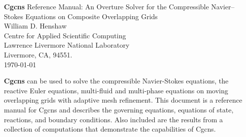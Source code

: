 \documentclass{article}
\begin{document}


\def\comma  {~~~,~~}
\newcommand{\uvd}{\mathbf{U}}
\def\ud     {{    U}}
\def\pd     {{    P}}
\def\calo{{\cal O}}

\newcommand{\mbar}{\bar{m}}
\newcommand{\Rbar}{\bar{R}}
\newcommand{\Ru}{R_u}         %
\newcommand{\Div}{\grad\cdot}
\newcommand{\tauv}{\boldsymbol{\tau}}
\newcommand{\thetav}{\boldsymbol{\theta}}

\newcommand{\Omegav}{\boldsymbol{\Omega}}
\newcommand{\omegav}{\boldsymbol{\omega}}
\newcommand{\cm}{{\rm cm}}

\newcommand{\sumi}{\sum_{i=1}^n}
\newcommand{\dt}{{\Delta t}}

\def\ff {\tt} %
\newcommand{\Ic}{{\mathcal I}}
\newcommand{\Rc}{{\mathcal R}}
\newcommand{\Gc}{{\mathcal G}}


\vspace{5\baselineskip}
\begin{flushleft}
{\Large
{\bf Cgcns} Reference Manual: An Overture Solver for the Compressible Navier--Stokes Equations 
  on Composite Overlapping Grids \\
}
\vspace{2\baselineskip}
William D. Henshaw  \\
Centre for Applied Scientific Computing  \\
Lawrence Livermore National Laboratory      \\
Livermore, CA, 94551.  \\
\vspace{\baselineskip}
\today\\
\vspace{\baselineskip}

\vspace{4\baselineskip}


{\bf Cgcns} can be used 
to solve the compressible Navier-Stokes equations, the reactive Euler equations,
multi-fluid and multi-phase equations on moving overlapping grids with
adaptive mesh refinement.
This document is a reference manual for Cgcns and
describes the governing equations, equations of state, reactions,
and boundary conditions. Also included are the results from a 
collection of computations that demonstrate the capabilities of Cgcns.



\end{flushleft}
\end{document}
